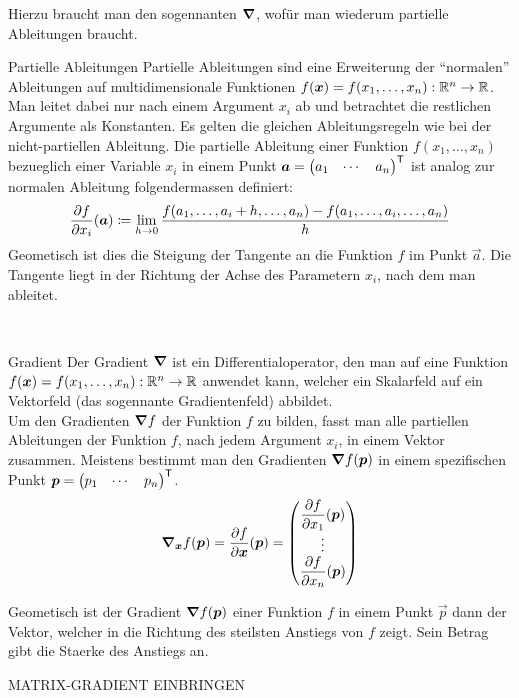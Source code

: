 Hierzu braucht man den sogennanten  $\bm{\nabla}$, wofür man wiederum partielle Ableitungen braucht.
\para{}
\begin{defbox}{Partielle Ableitungen}\label{ref:partielle_ableitungen}
  Partielle Ableitungen sind eine Erweiterung der ``normalen'' Ableitungen auf
  multidimensionale Funktionen $f(\bm{x}) = f(x_1,\ldots,x_n): \mathbb{R}^n \to \mathbb{R}$.
  Man leitet dabei nur nach einem Argument $x_i$ ab und betrachtet die restlichen Argumente als Konstanten.
  Es gelten die gleichen Ableitungsregeln wie bei der nicht-partiellen Ableitung.
  Die partielle Ableitung einer Funktion $f(x_1,\ldots,x_n)$ bezueglich einer
  Variable $x_i$ in einem Punkt $\bm{a} = \begin{pmatrix} a_1 & \cdots & a_n \end{pmatrix}^{\mathsf{T}}$
  ist analog zur normalen Ableitung folgendermassen definiert:
  \begin{equation*}
    \frac{\partial f}{\partial x_i}(\bm{a}) \coloneqq \lim_{h \to 0} \frac{f(a_1,\ldots,a_i + h,\ldots,a_n)-f(a_1,\ldots,a_i,\ldots,a_n)}{h}
  \end{equation*}
  Geometisch ist dies die Steigung der Tangente an die Funktion $f$ im Punkt
  $\vec{a}$. Die Tangente liegt in der Richtung der Achse des Parametern $x_i$, nach dem man ableitet.
\end{defbox}
\\
\begin{defbox}{Gradient}
  Der Gradient $\bm{\nabla}$ ist ein Differentialoperator, den man auf eine
  Funktion $f(\bm{x}) = f(x_1,\ldots,x_n): \mathbb{R}^n \to \mathbb{R}$ anwendet kann, welcher ein Skalarfeld auf ein Vektorfeld (das sogennante Gradientenfeld) abbildet.\\
  Um den Gradienten $\bm{\nabla}f$ der Funktion $f$ zu bilden, fasst man alle partiellen Ableitungen der Funktion $f$, nach jedem
  Argument $x_i$, in einem Vektor zusammen. Meistens bestimmt man den Gradienten
  $\bm{\nabla} f(\bm{p})$ in einem spezifischen Punkt $\bm{p} =
  \begin{pmatrix} p_1 & \cdots & p_n \end{pmatrix}^{\mathsf{T}}$.
  \begin{equation*}
    \bm{\nabla}_{\bm{x}} f(\bm{p}) = \displaystyle\frac{\partial f}{\partial \bm{x}}(\bm{p}) =
    \begin{pmatrix}
      \displaystyle\frac{\partial f}{\partial x_1}(\bm{p}) \\
      \vdots \\
      \displaystyle\frac{\partial f}{\partial x_n}(\bm{p}) \\
    \end{pmatrix}
  \end{equation*}

  Geometisch ist der Gradient $\bm{\nabla}f(\bm{p})$ einer Funktion $f$ in einem Punkt $\vec{p}$ dann der Vektor, welcher in die Richtung des steilsten Anstiegs von $f$ zeigt.
  Sein Betrag gibt die Staerke des Anstiegs an.

  MATRIX-GRADIENT EINBRINGEN
\end{defbox}
